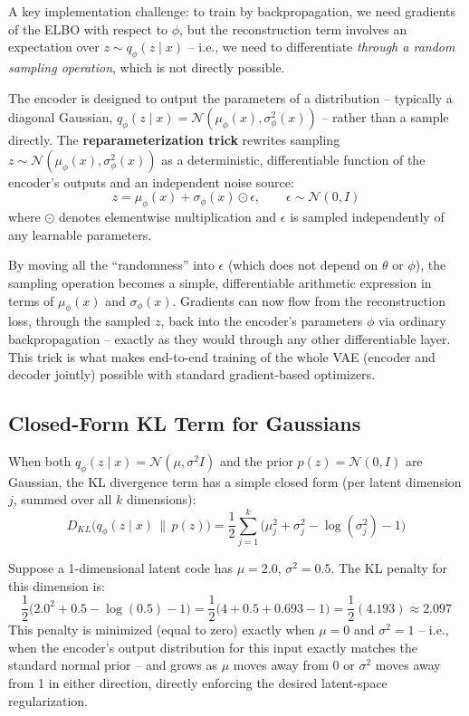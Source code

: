 \documentclass[12pt,a4paper]{article}
\begin{document}
A key implementation challenge: to train by backpropagation, we need gradients of the ELBO with respect to $\phi$, but the reconstruction term involves an expectation over $z \sim q_\phi(z\mid x)$ -- i.e., we need to differentiate \emph{through a random sampling operation}, which is not directly possible.

\begin{defbox}
The encoder is designed to output the parameters of a distribution -- typically a diagonal Gaussian, $q_\phi(z\mid x) = \mathcal{N}(\mu_\phi(x), \sigma_\phi^2(x))$ -- rather than a sample directly. The \textbf{reparameterization trick} rewrites sampling $z \sim \mathcal{N}(\mu_\phi(x), \sigma_\phi^2(x))$ as a deterministic, differentiable function of the encoder's outputs and an independent noise source:
\[
z = \mu_\phi(x) + \sigma_\phi(x) \odot \epsilon, \qquad \epsilon \sim \mathcal{N}(0, I)
\]
where $\odot$ denotes elementwise multiplication and $\epsilon$ is sampled independently of any learnable parameters.
\end{defbox}

\begin{keyidea}
By moving all the ``randomness'' into $\epsilon$ (which does not depend on $\theta$ or $\phi$), the sampling operation becomes a simple, differentiable arithmetic expression in terms of $\mu_\phi(x)$ and $\sigma_\phi(x)$. Gradients can now flow from the reconstruction loss, through the sampled $z$, back into the encoder's parameters $\phi$ via ordinary backpropagation -- exactly as they would through any other differentiable layer. This trick is what makes end-to-end training of the whole VAE (encoder and decoder jointly) possible with standard gradient-based optimizers.
\end{keyidea}

\subsection{Closed-Form KL Term for Gaussians}

When both $q_\phi(z\mid x) = \mathcal{N}(\mu, \sigma^2 I)$ and the prior $p(z) = \mathcal{N}(0, I)$ are Gaussian, the KL divergence term has a simple closed form (per latent dimension $j$, summed over all $k$ dimensions):
\[
D_{KL}\big(q_\phi(z\mid x)\,\|\,p(z)\big) = \frac{1}{2}\sum_{j=1}^{k}\Big(\mu_j^2 + \sigma_j^2 - \log(\sigma_j^2) - 1\Big)
\]

\begin{example}
Suppose a 1-dimensional latent code has $\mu = 2.0$, $\sigma^2 = 0.5$. The KL penalty for this dimension is:
\[
\frac{1}{2}\big(2.0^2 + 0.5 - \log(0.5) - 1\big) = \frac{1}{2}\big(4 + 0.5 + 0.693 - 1\big) = \frac{1}{2}(4.193) \approx 2.097
\]
This penalty is minimized (equal to zero) exactly when $\mu = 0$ and $\sigma^2 = 1$ -- i.e., when the encoder's output distribution for this input exactly matches the standard normal prior -- and grows as $\mu$ moves away from 0 or $\sigma^2$ moves away from 1 in either direction, directly enforcing the desired latent-space regularization.
\end{example}
\end{document}
